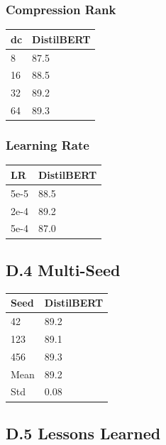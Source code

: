 \subsubsection{Compression Rank}

\begin{table}[H]
\centering
\small
\begin{tabular}{ll}
\toprule
\textbf{dc} & \textbf{DistilBERT} \\
\midrule
8 & 87.5 \\
16 & 88.5 \\
32 & 89.2 \\
64 & 89.3 \\
\bottomrule
\end{tabular}
\end{table}

\subsubsection{Learning Rate}

\begin{table}[H]
\centering
\small
\begin{tabular}{ll}
\toprule
\textbf{LR} & \textbf{DistilBERT} \\
\midrule
5e-5 & 88.5 \\
2e-4 & 89.2 \\
5e-4 & 87.0 \\
\bottomrule
\end{tabular}
\end{table}

\subsection{D.4 Multi-Seed}

\begin{table}[H]
\centering
\small
\begin{tabular}{ll}
\toprule
\textbf{Seed} & \textbf{DistilBERT} \\
\midrule
42 & 89.2 \\
123 & 89.1 \\
456 & 89.3 \\
Mean & 89.2 \\
Std & 0.08 \\
\bottomrule
\end{tabular}
\end{table}

\subsection{D.5 Lessons Learned}


